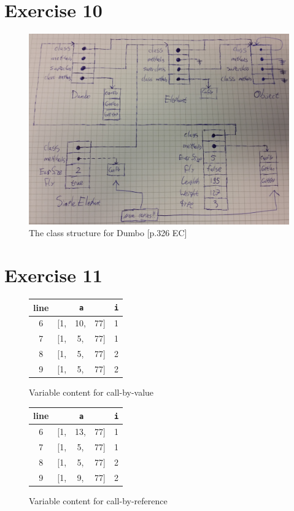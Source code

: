 \documentclass[11pt]{article} %
\begin{document}
\section*{Exercise 10}
\begin{figure}[H]
\includegraphics[width=\textwidth]{Ex5-10.jpg}
\caption{The class structure for Dumbo [p.326 EC]}
\end{figure}

\section*{Exercise 11}
\begin{figure}[H]
\centering
\begin{tabular}{ccccc}
line & \multicolumn{3}{c}{\texttt{a}} & \texttt{i} \\ 
\hline 
6 & [1, & 10, & 77] & 1 \\ 
7 & [1, & 5, & 77] & 1 \\ 
8 & [1, & 5, & 77] & 2 \\ 
9 & [1, & 5, & 77] & 2 \\ 
\hline 
\end{tabular} 
\caption{Variable content for call-by-value}
\end{figure}

\begin{figure}[H]
\centering
\begin{tabular}{ccccc}
line & \multicolumn{3}{c}{\texttt{a}} & \texttt{i} \\ 
\hline 
6 & [1, & 13, & 77] & 1 \\ 
7 & [1, & 5, & 77] & 1 \\ 
8 & [1, & 5, & 77] & 2 \\ 
9 & [1, & 9, & 77] & 2 \\ 
\hline 
\end{tabular} 
\caption{Variable content for call-by-reference}
\end{figure}
\end{document}

